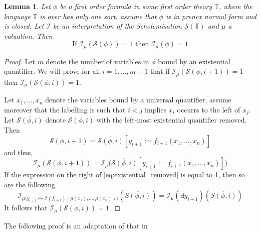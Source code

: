 \documentclass[12pt]{article}
\theoremstyle{plain}
\newtheorem{lemma}[thm]{Lemma}
\theoremstyle{definition}
\newcommand{\bb}[1]{\mathbb{#1}}
\newcommand{\call}[1]{\mathcal{#1}}
\begin{document}
	\begin{lemma}\label{lem:skolem_to_original}
		Let $\phi$ be a first order formula in some first order theory $\bb{T}$, where the language $\bb{T}$ is over has only one sort, assume that $\phi$ is in prenex normal form and is closed. Let $\call{I}$ be an interpretation of the Scholemisation $\call{S}(\bb{T})$ and $\mu$ a valuation. Then
		\begin{equation}
			\text{If }\call{I}_\mu(\call{S}(\phi)) = 1\text{ then }\call{I}_\mu(\phi) = 1
			\end{equation}
		\end{lemma}
	\begin{proof}
		Let $m$ denote the number of variables in $\phi$ bound by an existential quantifier. We will prove for all $i = 1, \ldots, m-1$ that if $\call{I}_\mu(\call{S}(\phi, i+1)) = 1$ then $\call{I}_\mu(\call{S}(\phi, i)) = 1$.
		
		Let $x_1, \ldots, x_n$ denote the variables bound by a universal quantifier, assume moreover that the labelling is such that $i < j$ implies $x_i$ occurrs to the left of $x_j$. Let $\overline{\call{S}(\phi, i)}$ denote $\call{S}(\phi, i)$ with the left-most existential quantifier removed. Then
		\begin{equation}
			\call{S}(\phi, i + 1) = \overline{\call{S}(\phi, i)}[y_{i + 1} := f_{i+1}(x_1, \ldots, x_n)]
			\end{equation}
	and thus,
		\begin{equation}\label{eq:existential_removed}
			\call{I}_\mu(\call{S}(\phi, i + 1)) = \call{I}_\mu\Big(\overline{\call{S}(\phi, i)}[y_{i+1} := f_{i+1}(x_1, \ldots, x_n)]\Big)
			\end{equation}
		If the expression on the right of \eqref{eq:existential_removed} is equal to 1, then so are the following
		\begin{equation}
			\call{I}_{\mu\big(y_{i+1} \mapsto \call{I}(f_{i+1})(\mu(x_1), \ldots, \mu(x_n))\big)}(\overline{S(\phi, i)}) = \call{I}_\mu(\exists y_{i+1})(\overline{S(\phi, i)})
			\end{equation}
		It follows that $\call{I}_\mu(\call{S}(\phi, i)) = 1$.
		\end{proof}
	
	
	
	
	
	The following proof is an adaptation of that in \cite{karlin}.
	
\end{document}
